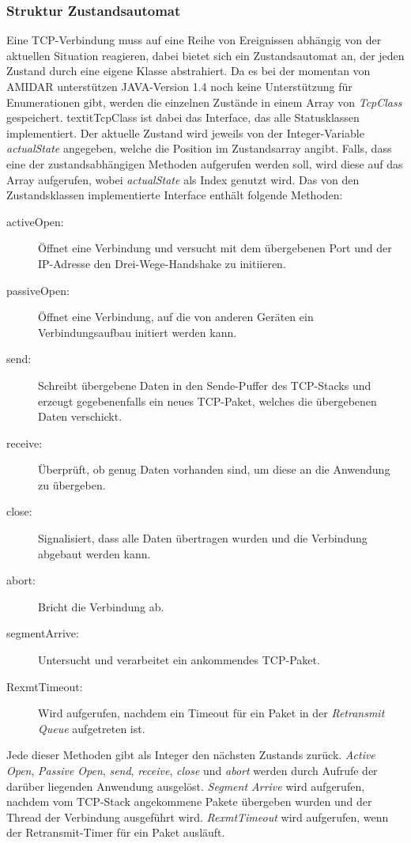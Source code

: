 \subsubsection{Struktur Zustandsautomat}
Eine TCP-Verbindung muss auf eine Reihe von Ereignissen abhängig von der aktuellen Situation reagieren, dabei bietet sich ein Zustandsautomat an, der jeden Zustand durch eine eigene Klasse abstrahiert. Da es bei der momentan von AMIDAR unterstützen JAVA-Version 1.4 noch keine Unterstützung für Enumerationen gibt, werden die einzelnen Zustände in einem Array von \textit{TcpClass} gespeichert. textit{TcpClass} ist dabei das Interface, das alle Statusklassen implementiert. Der aktuelle Zustand wird jeweils von der Integer-Variable \textit{actualState} angegeben, welche die Position im Zustandsarray angibt. Falls, dass eine der zustandsabhängigen Methoden aufgerufen werden soll, wird diese auf das Array aufgerufen, wobei \textit{actualState} als Index genutzt wird. Das von den Zustandsklassen implementierte Interface enthält folgende Methoden:
\begin{description}
\item[activeOpen:] Öffnet eine Verbindung und versucht mit dem übergebenen Port und der IP-Adresse den Drei-Wege-Handshake zu initiieren. 
\item[passiveOpen:] Öffnet eine Verbindung, auf die von anderen Geräten ein Verbindungsaufbau initiert werden kann. 
\item[send:] Schreibt übergebene Daten in den Sende-Puffer des TCP-Stacks und erzeugt gegebenenfalls ein neues TCP-Paket, welches die übergebenen Daten verschickt. 
\item[receive:] Überprüft, ob genug Daten vorhanden sind, um diese an die Anwendung zu übergeben. 
\item[close:] Signalisiert, dass alle Daten übertragen wurden und die Verbindung abgebaut werden kann. 
\item[abort:] Bricht die Verbindung ab.
\item[segmentArrive:] Untersucht und verarbeitet ein ankommendes TCP-Paket.
\item[RexmtTimeout:] Wird aufgerufen, nachdem ein Timeout für ein Paket in der \textit{Retransmit Queue} aufgetreten ist. 
\end{description}
Jede dieser Methoden gibt als Integer den nächsten Zustands zurück. \textit{Active Open}, \textit{Passive Open}, \textit{send}, \textit{receive}, \textit{close} und \textit{abort} werden durch Aufrufe der darüber liegenden Anwendung ausgelöst. \textit{Segment Arrive} wird aufgerufen, nachdem vom TCP-Stack angekommene Pakete übergeben wurden und der Thread der Verbindung ausgeführt wird. 
\textit{RexmtTimeout} wird aufgerufen, wenn der Retransmit-Timer für ein Paket ausläuft. 

